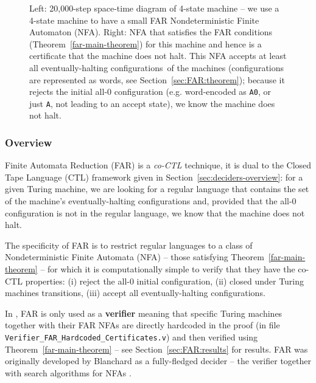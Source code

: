 \begin{figure}[h]
\begin{subfigure}[t]{0.5\textwidth}
        \label{fig:far_nfa}
    \end{subfigure}
    \caption[Short caption]{Left: 20,000-step space-time diagram of 4-state machine  -- we use a 4-state machine to have a small FAR Nondeterministic Finite Automaton (NFA). Right: NFA that satisfies the FAR conditions (Theorem~\ref{far-main-theorem}) for this machine and hence is a certificate that the machine does not halt. This NFA accepts at least all eventually-halting configurations\footnotemark ~of the machines (configurations are represented as words, see Section~\ref{sec:FAR:theorem}); because it rejects the initial all-0 configuration (e.g. word-encoded as \texttt{A0}, or just \texttt{A}, not leading to an accept state), we know the machine does not halt.}
    \label{fig:finite-automata-reduction}
\end{figure}


\subsubsection{Overview}

\newcommand{\M}{M}
\newcommand{\T}{^{T}}

Finite Automata Reduction (FAR) is a \textit{co-CTL} technique, \ie it is dual to the Closed Tape Language (CTL) framework given in Section~\ref{sec:deciders-overview}: for a given Turing machine, we are looking for a regular language that contains the set of the machine's eventually-halting configurations and, provided that the all-0 configuration is not in the regular language, we know that the machine does not halt.

The specificity of FAR is to restrict regular languages to a class of Nondeterministic Finite Automata (NFA) -- those satisfying Theorem~\ref{far-main-theorem} -- for which it is computationally simple to verify that they have the co-CTL properties: (i) reject the all-0 initial configuration, (ii) closed under Turing machines transitions, (iii) accept all eventually-halting configurations.

In \CoqBB, FAR is only used as a \textbf{verifier} meaning that specific Turing machines together with their FAR NFAs are directly hardcoded in the proof (in file \texttt{Verifier\_FAR\_Hardcoded\_Certificates.v}) and then verified using Theorem~\ref{far-main-theorem} -- see Section~\ref{sec:FAR:results} for results. FAR was originally developed by Blanchard as a fully-fledged decider -- \ie the verifier together with search algorithms for NFAs \cite{FAR}.

